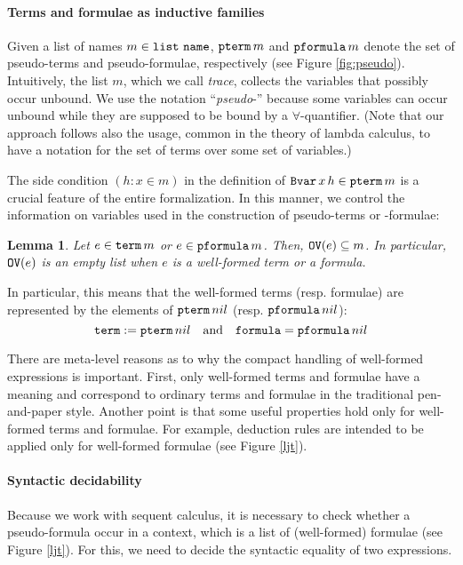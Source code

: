 \documentclass{svjour3}                     %
\newtheorem{lem}[thm]{Lemma}
\newcommand{\tm}{\subseteq}
\newcommand{\tBvar}{\textup{\tt Bvar}}
\newcommand{\tnat}{\textup{\tt name}}
\newcommand{\tpterm}{\textup{\tt pterm}}
\newcommand{\tpfml}{\textup{\tt pformula}}
\newcommand{\tterm}{\textup{\tt term}}
\newcommand{\tfml}{\textup{\tt formula}}
\newcommand{\tPH}{\textup{\tt OV}}
\newcommand{\tlist}{\textup{\tt list}}
\begin{document}
\paragraph{\bf Terms and formulae as inductive families}
Given a list of names $m \in \tlist\,\, \tnat$, $\tpterm\, m$ and $\tpfml\, m$ denote the set of pseudo-terms and pseudo-formulae, respectively (see Figure \ref{fig:pseudo}). Intuitively, the list $m$, which we call {\em trace}, collects the variables that possibly occur unbound. We use the notation ``\textit{pseudo}-'' because some variables can occur unbound while they are supposed to be bound by a $\forall$-quantifier.
(Note that our approach follows also the usage, common in the theory of lambda calculus, to have a notation for the set of terms over some set of variables.)

The side condition $(h : x \in m)$ in the definition of $\tBvar\, x\, h
\in \tpterm\, m$ is a crucial feature of the entire formalization. In
this manner, we control the information on variables used in the
construction of pseudo-terms or -formulae:

\begin{lem}\label{ph-property}
  Let $e \in \tterm\, m$ or $e \in \tpfml\, m$. Then, $\tPH(e) \tm m$. In particular, $\tPH(e)$ is an empty list when $e$ is a well-formed term or a formula.
\end{lem}
In particular, this means that the well-formed terms (resp. formulae) are represented by the elements of $\tpterm\, nil$ (resp. $\tpfml\, nil$):
\begin{equation*}
  \tterm :=  \tpterm\, nil\quad \text{and} \quad
  \tfml  = \tpfml\, nil
\end{equation*}

There are meta-level reasons as to why the compact handling
of well-formed expressions is important. First, only well-formed terms
and formulae have a meaning and correspond to ordinary terms and
formulae in the traditional pen-and-paper style. Another point is that some useful properties hold only for well-formed terms and formulae. For example, deduction rules are intended to be applied only for well-formed formulae (see Figure \ref{ljt}).


\paragraph{\bf Syntactic decidability}
Because we work with sequent calculus, it is necessary to check whether a pseudo-formula occur in a context, which is a list of (well-formed) formulae (see Figure \ref{ljt}). For this, we need to decide the syntactic equality of two expressions.
\end{document}
